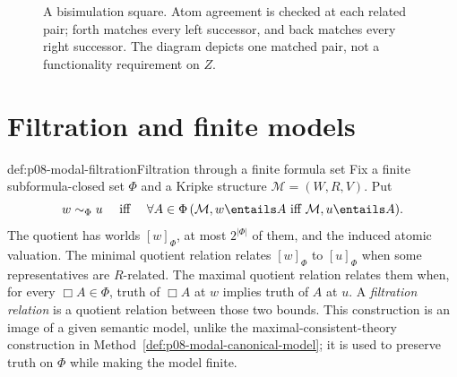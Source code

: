 \begin{figure}[!htbp]
\centering
{}
\caption{A bisimulation square.  Atom agreement is checked
at each related pair; forth matches every left successor, and back matches
every right successor.  The diagram depicts one matched pair, not a
functionality requirement on \(Z\).}
\label{fig:p08-modal-bisimulation}
\end{figure}

\section{Filtration and finite models}\label{sec:p08-modal-filtration}

\begin{hbmethod}{def:p08-modal-filtration}{Filtration through a finite formula set}
Fix a finite subformula-closed set \(\Phi\) and a Kripke structure
\(\mathcal M=(W,R,V)\).  Put
\[
 w\sim_{\Phi}u
 \quad\text{ iff }\quad
 \forall A\in\Phi\,
   (\mathcal M,w\entails A\text{ iff }\mathcal M,u\entails A).
\]
The quotient has worlds \([w]_{\Phi}\), at most \(2^{\lvert\Phi\rvert}\)
of them, and the induced atomic valuation.  The minimal quotient relation
relates \([w]_{\Phi}\) to \([u]_{\Phi}\) when some representatives are
\(R\)-related.  The maximal quotient relation relates them when, for every
\(\Box A\in\Phi\), truth of \(\Box A\) at \(w\) implies truth of \(A\) at
\(u\).  A \emph{filtration relation} is a quotient relation between those two
bounds.  This construction is an image of a given semantic model, unlike the
maximal-consistent-theory construction in
Method~\ref{def:p08-modal-canonical-model}; it is used to preserve truth on
\(\Phi\) while making the model finite.
\end{hbmethod}

